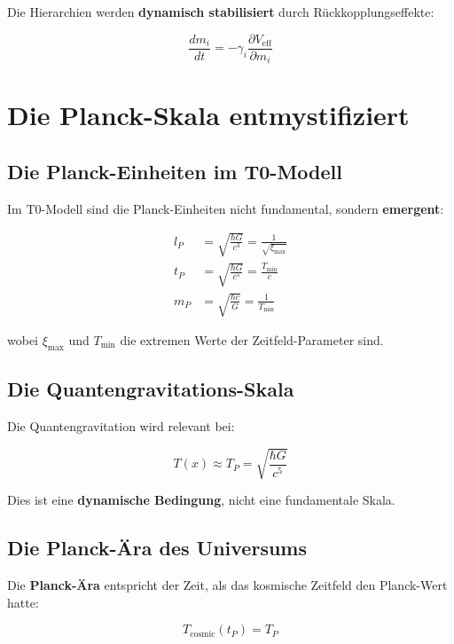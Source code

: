 \documentclass[12pt,a4paper]{report}
\begin{document}
	Die Hierarchien werden \textbf{dynamisch stabilisiert} durch Rückkopplungseffekte:
	
	\begin{equation}
		\frac{dm_i}{dt} = -\gamma_i \frac{\partial V_{\text{eff}}}{\partial m_i}
	\end{equation}
	
	\section{Die Planck-Skala entmystifiziert}
	
	\subsection{Die Planck-Einheiten im T0-Modell}
	
	Im T0-Modell sind die Planck-Einheiten nicht fundamental, sondern \textbf{emergent}:
	
	\begin{align}
		l_P &= \sqrt{\frac{\hbar G}{c^3}} = \frac{1}{\sqrt{\xi_{\max}}} \\
		t_P &= \sqrt{\frac{\hbar G}{c^5}} = \frac{T_{\min}}{c} \\
		m_P &= \sqrt{\frac{\hbar c}{G}} = \frac{1}{T_{\min}}
	\end{align}
	
	wobei $\xi_{\max}$ und $T_{\min}$ die extremen Werte der Zeitfeld-Parameter sind.
	
	\subsection{Die Quantengravitations-Skala}
	
	Die Quantengravitation wird relevant bei:
	
	\begin{equation}
		T(x) \approx T_P = \sqrt{\frac{\hbar G}{c^5}}
	\end{equation}
	
	Dies ist eine \textbf{dynamische Bedingung}, nicht eine fundamentale Skala.
	
	\subsection{Die Planck-Ära des Universums}
	
	Die \textbf{Planck-Ära} entspricht der Zeit, als das kosmische Zeitfeld den Planck-Wert hatte:
	
	\begin{equation}
		T_{\text{cosmic}}(t_P) = T_P
	\end{equation}
	
\end{document}
